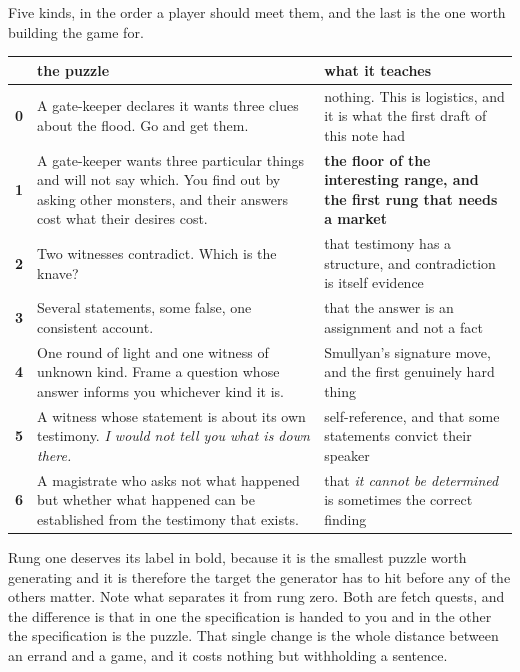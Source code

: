 \documentclass[11pt,a4paper]{article}
\begin{document}
Five kinds, in the order a player should meet them, and the last is the one worth building the game
for.

\begin{center}
\begin{tabular}{@{}l@{\hspace{3mm}}>{\raggedright\arraybackslash}p{}@{\hspace{3mm}}>{\raggedright\arraybackslash}p{}@{}}
\toprule
& \textbf{the puzzle} & \textbf{what it teaches} \\
\midrule
\textbf{0} & A gate-keeper declares it wants three clues about the flood. Go and get them. &
nothing. This is logistics, and it is what the first draft of this note had \\[1mm]
\textbf{1} & A gate-keeper wants three particular things and will not say which. You find out by asking
other monsters, and their answers cost what their desires cost. &
\textbf{the floor of the interesting range, and the first rung that needs a market} \\[1mm]
\textbf{2} & Two witnesses contradict. Which is the knave? &
that testimony has a structure, and contradiction is itself evidence \\[1mm]
\textbf{3} & Several statements, some false, one consistent account. &
that the answer is an assignment and not a fact \\[1mm]
\textbf{4} & One round of light and one witness of unknown kind. Frame a question whose answer
informs you whichever kind it is. &
Smullyan's signature move, and the first genuinely hard thing \\[1mm]
\textbf{5} & A witness whose statement is about its own testimony. \emph{I would not tell you what
is down there.} &
self-reference, and that some statements convict their speaker \\[1mm]
\textbf{6} & A magistrate who asks not what happened but whether what happened can be established
from the testimony that exists. &
that \emph{it cannot be determined} is sometimes the correct finding \\
\bottomrule
\end{tabular}
\end{center}

Rung one deserves its label in bold, because it is the smallest puzzle worth generating and it is
therefore the target the generator has to hit before any of the others matter. Note what separates
it from rung zero. Both are fetch quests, and the difference is that in one the specification is
handed to you and in the other the specification is the puzzle. That single change is the whole
distance between an errand and a game, and it costs nothing but withholding a sentence.
\end{document}
